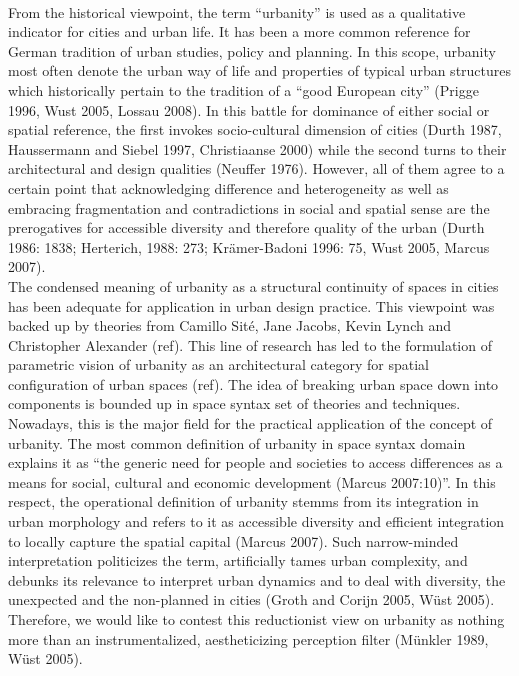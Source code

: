 \documentclass[11pt]{report}
\begin{document}
\\
From the historical viewpoint, the term “urbanity”  is used as a qualitative indicator for cities and urban life. It has been a more common reference for German tradition of urban studies, policy and planning. In this scope, urbanity most often denote the urban way of life and properties of typical urban structures which historically pertain to the tradition of a “good European city” (Prigge 1996, Wust 2005, Lossau 2008). In this battle for dominance of either social or spatial reference, the first invokes socio-cultural dimension of cities (Durth 1987, Haussermann and Siebel 1997, Christiaanse 2000) while the second turns to their architectural and design qualities (Neuffer 1976). However, all of them agree to a certain point that acknowledging difference and heterogeneity as well as embracing fragmentation and contradictions in social and spatial sense are the prerogatives for accessible diversity and therefore quality of the urban (Durth 1986: 1838; Herterich, 1988: 273; Krämer-Badoni 1996: 75, Wust 2005, Marcus 2007). 
\\
The condensed meaning of urbanity as a structural continuity of spaces in cities has been adequate for application in urban design practice. This viewpoint was backed up by theories from Camillo Sité, Jane Jacobs, Kevin Lynch and Christopher Alexander (ref). This line of research has led to the formulation of parametric vision of urbanity as an architectural category for spatial configuration of urban spaces (ref). The idea of breaking urban space down into components is bounded up in space syntax set of theories and techniques. Nowadays, this is the major field for the practical application of the concept of urbanity. The most common definition of urbanity in space syntax domain explains it as “the generic need for people and societies to access differences as a means for social, cultural and economic development (Marcus 2007:10)”. In this respect, the operational definition of urbanity stemms from its integration in urban morphology  and refers to it as accessible diversity and efficient integration to locally capture the spatial capital (Marcus 2007). Such narrow-minded interpretation politicizes the term, artificially tames urban complexity, and debunks its relevance to interpret urban dynamics  and to deal with diversity, the unexpected and the non-planned in cities (Groth and Corijn 2005, Wüst 2005). Therefore, we would like to contest this reductionist view on urbanity as nothing more than an instrumentalized, aestheticizing perception filter (Münkler 1989, Wüst 2005).
\end{document}
